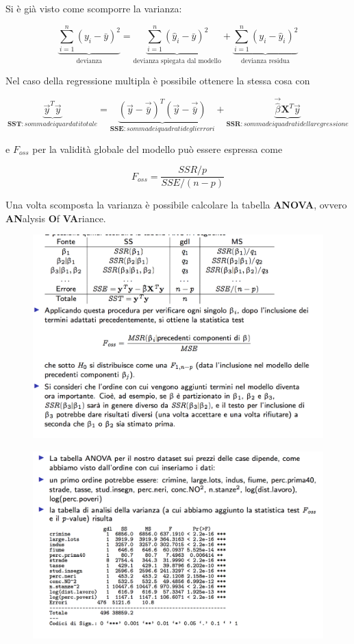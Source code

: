 Si è già visto come scomporre la varianza:

$$
\underbrace{\sum\limits_{i=1}^n (y_i - \bar{y})^2}_{\text{devianza}} = \underbrace{\sum\limits_{i=1}^n (\hat{y}_i - \bar{y})^2}_{\text{devianza spiegata dal modello}} + \underbrace{\sum\limits_{i=1}^n (y_i - \hat{y}_i)^2}_{\text{devianza residua}}  
$$

Nel caso della regressione multipla è possibile ottenere la stessa cosa con

$$
\underbrace{\vec{y}^T\vec{y}}_{\textbf{SST}: somma dei quardati totale} = 
\underbrace{(\vec{y} - \vec{\bar{y}})^T (\vec{y} - \vec{\bar{y}})}_{\textbf{SSE}: somma dei quadrati degli errori} +
\underbrace{\vec{\hat{\beta}} \textbf{X}^T\vec{y}}_{\textbf{SSR}: somma dei quadrati della regressione}
$$

e $F_{oss} $ per la validità globale del modello può essere espressa come

$$
F_{oss} = \frac{SSR/p}{SSE/(n-p)}
$$

Una volta scomposta la varianza è possibile calcolare la tabella \textbf{ANOVA}, ovvero \textbf{AN}alysis \textbf{O}f \textbf{VA}riance.


\begin{figure}[htbp]
	\centering
	\includegraphics[width=.7\textwidth]{./notes/immagini/l10-fig3.png}
\end{figure}

\begin{figure}[htbp]
	\centering
	\includegraphics[width=.7\textwidth]{./notes/immagini/l10-fig4.png}
\end{figure}





